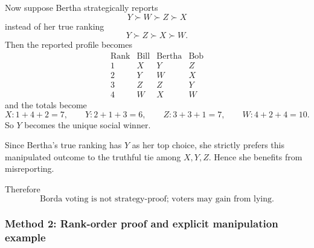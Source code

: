 \documentclass[12pt]{article}
\begin{document}
\begin{enumerate}[label=(\alph*)]
    Now suppose Bertha strategically reports
    \[
    Y \succ W \succ Z \succ X
    \]
    instead of her true ranking
    \[
    Y \succ Z \succ X \succ W.
    \]
    Then the reported profile becomes
    \[
    \begin{array}{c|ccc}
    \text{Rank} & \text{Bill} & \text{Bertha} & \text{Bob} \\ \hline
    1 & X & Y & Z \\
    2 & Y & W & X \\
    3 & Z & Z & Y \\
    4 & W & X & W
    \end{array}
    \]
    and the totals become
    \[
    X:1+4+2=7,
    \qquad
    Y:2+1+3=6,
    \qquad
    Z:3+3+1=7,
    \qquad
    W:4+2+4=10.
    \]
    So $Y$ becomes the unique social winner.

    Since Bertha's true ranking has $Y$ as her top choice, she strictly prefers this manipulated outcome to the truthful tie among $X,Y,Z$. Hence she benefits from misreporting.

    Therefore
    \[
    \boxed{\text{Borda voting is not strategy-proof; voters may gain from lying.}}
    \]
\end{enumerate}

\subsubsection{Method 2: Rank-order proof and explicit manipulation example}
\end{document}
